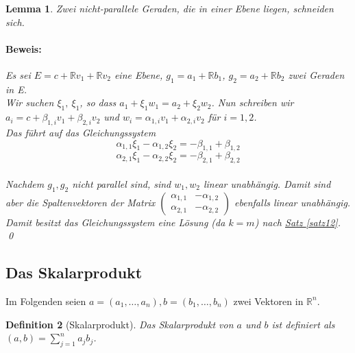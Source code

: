 \documentclass{report}
\newcommand{\IN}[1]{\index{#1|BH}}
\newcommand{\R}{\mathbb{R}}
\newcommand{\mRn}{\(\mathbb{R}^n\)}
\newcommand{\al}{\alpha}
\theoremstyle{customrem}
\theoremstyle{customdef}
\newtheorem{definition}{Definition}[chapter]
\newtheorem{lemma}[definition]{Lemma}
\renewenvironment{proof}{\paragraph{Beweis: }}{\qed}
\begin{document}
	\begin{lemma}
		Zwei nicht-parallele Geraden, die in einer Ebene liegen, schneiden sich.\\
		\begin{proof}
			Es sei \(E = c + \R v_1 + \R v_2\) eine Ebene, \(g_1 = a_1 + \R b_1\), \(g_2 = a_2 + \R b_2\) zwei Geraden in E.\\
			Wir suchen \(\xi_1,\ \xi_1\), so dass \(a_1 + \xi_1 w_1 = a_2 + \xi_2 w_2\). Nun schreiben wir \(a_i = c + \beta_{1,i} v_1 + \beta_{2,i} v_2\) und \(w_i = \al_{1,i} v_1 + \al_{2,i} v_2\) für \(i =1,2\).\\
			Das führt auf das Gleichungssystem\\
			\[
			\al_{1,1} \xi_1 - \al_{1,2} \xi_2 = - \beta_{1,1} + \beta_{1,2}\]\[
			\al_{2,1} \xi_1 - \al_{2,2} \xi_2 = - \beta_{2,1} + \beta_{2,2}
			\]\\
			Nachdem \(g_1, g_2\) nicht parallel sind, sind \(w_1, w_2\) linear unabhängig. Damit sind aber die Spaltenvektoren der Matrix \(
			\begin{pmatrix}
			\al_{1,1} & -\al_{1,2}\\
			\al_{2,1} & -\al_{2,2}
			\end{pmatrix}
			\) ebenfalls linear unabhängig. Damit besitzt das Gleichungssystem eine Lösung (da \(k = m\)) nach \hyperref[satz12]{Satz \ref*{satz12}}.
		\end{proof}
	\end{lemma}
	\vspace{.4cm}
	\subsection{Das Skalarprodukt}
	Im Folgenden seien \(a = (a_1, \dots, a_n), b = (b_1, \dots, b_n)\) zwei Vektoren in \mRn.
	
	\begin{definition}[Skalarprodukt]
		\IN{Skalarprodukt}
		Das Skalarprodukt von \(a\) und \(b\) ist definiert als \((a, b) = \sum_{j=1}^n a_j b_j\).
	\end{definition}
	
\end{document}

